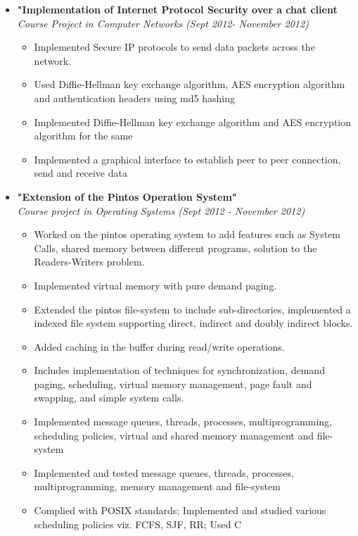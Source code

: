 \documentclass[margin,line]{resume}
\begin{document}
\begin{resume}
\begin{itemize}
  \item \large{\textbf{\textsf{"Implementation of Internet Protocol Security over a chat client}}}
    \\ \small{\textit{Course Project in Computer Networks (Sept 2012- November 2012)}}
    \normalsize
    \begin{itemize}
    \item Implemented Secure IP protocols to send data packets across the network.
    \item Used Diffie-Hellman key exchange algorithm, AES encryption algorithm and authentication headers using md5 hashing
    \item Implemented Diffie-Hellman key exchange algorithm and AES encryption algorithm for the same
    \item Implemented a graphical interface to establish peer to peer connection, send and receive data
    \end{itemize}

  \item \large{\textbf{\textsf{"Extension of the Pintos Operation System"}}}
    \\ \small{\textit{Course project in Operating Systems (Sept 2012 - November 2012)}}
    \normalsize
    \begin{itemize}
    \item Worked on the pintos operating system to add features such as System Calls, shared memory between different programs, solution to the Readers-Writers problem.
    \item Implemented virtual memory with pure demand paging.
    \item Extended the pintos file-system to include sub-directories, implemented a indexed file system supporting direct, indirect and doubly indirect blocks.
    \item Added caching in the buffer during read/write operations.
    \item Includes implementation of techniques for synchronization, demand paging, scheduling, virtual memory management, page fault and swapping, and simple system calls.
    \item Implemented message queues, threads, processes, multiprogramming, scheduling policies, virtual and shared memory management and file-system
    \item Implemented and tested message queues, threads, processes, multiprogramming, memory management and file-system
    \item Complied with POSIX standards; Implemented and studied various scheduling policies viz. FCFS, SJF, RR; Used C
    \end{itemize}


\end{itemize}
\end{resume}
\end{document}
